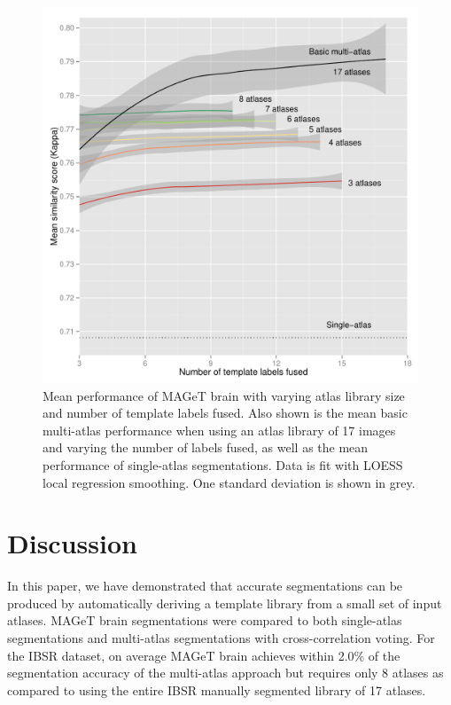 \documentclass{article}\usepackage{graphicx, color}
\makeatletter
\def\maxwidth{ %
  \ifdim\Gin@nat@width>\linewidth
    \linewidth
  \else
    \Gin@nat@width
  \fi
}
\newenvironment{knitrout}{}{} %
\makeatother
\begin{document}
\begin{figure}[t]
  \centering
\begin{knitrout}
\color{fgcolor}\includegraphics[width=\maxwidth]{figure/performance} 
\end{knitrout}

\caption{{\small
Mean performance of MAGeT brain with varying atlas library size and number of
template labels fused. Also shown is the mean basic multi-atlas
performance when using an atlas library of 17 images and varying the number of
labels fused, as well as the mean performance of single-atlas segmentations.
Data is fit with LOESS local regression smoothing. One standard deviation is
shown in grey.
}}
\label{results}
\end{figure}

\section{Discussion}

In this paper, we have demonstrated that accurate segmentations can be produced
by automatically deriving a template library from a small set of input atlases.
MAGeT brain segmentations were compared to both single-atlas segmentations and
multi-atlas segmentations with cross-correlation voting.  For the IBSR dataset,
on average MAGeT brain achieves within 2.0\% of the segmentation accuracy of
the multi-atlas approach but requires only 8 atlases as compared to using the
entire IBSR manually segmented library of 17 atlases.
\end{document}
